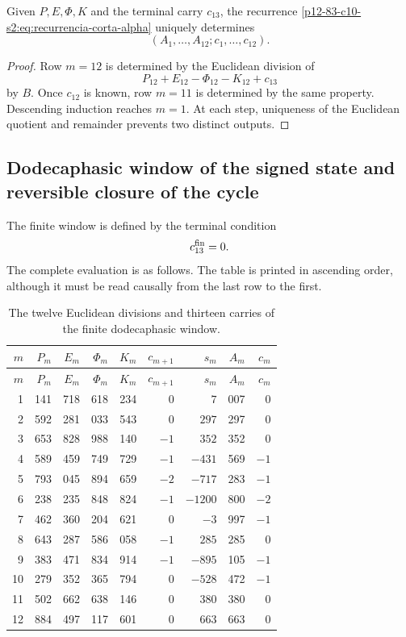 \begin{theorem}
\label{p12-83-c10-s2:thm:unicidad-acarreo-orientado-alpha}
Given \(P,E,\Phi,K\) and the terminal carry \(c_{13}\), the recurrence
\eqref{p12-83-c10-s2:eq:recurrencia-corta-alpha} uniquely determines
\[
 (A_1,\ldots,A_{12};c_1,\ldots,c_{12}).
\]
\end{theorem}

\begin{proof}
Row \(m=12\) is determined by the Euclidean division of
\[
 P_{12}+E_{12}-\Phi_{12}-K_{12}+c_{13}
\]
by \(B\). Once \(c_{12}\) is known, row \(m=11\) is determined by
the same property. Descending induction reaches \(m=1\). At each
step, uniqueness of the Euclidean quotient and remainder prevents two distinct
outputs.
\end{proof}

\subsection{Dodecaphasic window of the signed state and reversible closure of the cycle}

The finite window is defined by the terminal condition
\[
 c_{13}^{\rm fin}=0.
\]
The complete evaluation is as follows. The table is printed in ascending
order, although it must be read causally from the last row to the
first.

\begingroup
\scriptsize
\setlength{\tabcolsep}{3.2pt}
\begin{longtable}{@{}r|rrrr|r|r|r|r@{}}
\caption{The twelve Euclidean divisions and thirteen carries of the finite
dodecaphasic window.}
\label{p12-83-c10-s2:tab:acarreo-alpha-finito-autonomo}\\
\toprule
\(m\)&\(P_m\)&\(E_m\)&\(\Phi_m\)&\(K_m\)&
\(c_{m+1}\)&\(s_m\)&\(A_m\)&\(c_m\)\\
\midrule
\endfirsthead
\toprule
\(m\)&\(P_m\)&\(E_m\)&\(\Phi_m\)&\(K_m\)&
\(c_{m+1}\)&\(s_m\)&\(A_m\)&\(c_m\)\\
\midrule
\endhead
1  &141&718&618&234& \(0\)& \(7\)&007& \(0\)\\
2  &592&281&033&543& \(0\)& \(297\)&297& \(0\)\\
3  &653&828&988&140& \(-1\)& \(352\)&352& \(0\)\\
4  &589&459&749&729& \(-1\)& \(-431\)&569& \(-1\)\\
5  &793&045&894&659& \(-2\)& \(-717\)&283& \(-1\)\\
6  &238&235&848&824& \(-1\)& \(-1200\)&800& \(-2\)\\
7  &462&360&204&621& \(0\)& \(-3\)&997& \(-1\)\\
8  &643&287&586&058& \(-1\)& \(285\)&285& \(0\)\\
9  &383&471&834&914& \(-1\)& \(-895\)&105& \(-1\)\\
10 &279&352&365&794& \(0\)& \(-528\)&472& \(-1\)\\
11 &502&662&638&146& \(0\)& \(380\)&380& \(0\)\\
12 &884&497&117&601& \(0\)& \(663\)&663& \(0\)\\
\bottomrule
\end{longtable}
\endgroup

